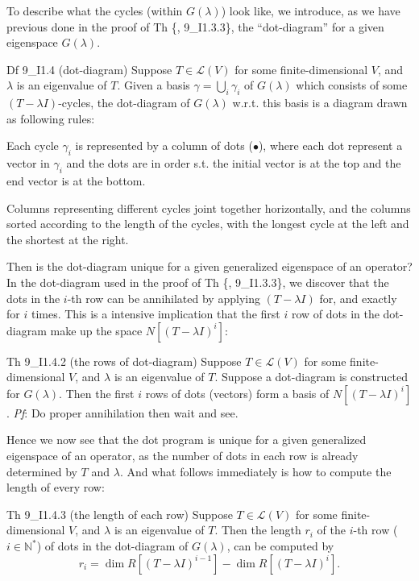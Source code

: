 \documentclass{article}
\begin{document}
To describe what the cycles (within $G(\lambda)$) look like, we introduce, as we have previous done in the proof of Th \{, 9\_I1.3.3\}, the ``dot-diagram'' for a given eigenspace $G(\lambda)$.

\begin{Df}{Df 9\_I1.4 (dot-diagram)}
    Suppose $T\in\mathcal{L}(V)$ for some finite-dimensional $V$, and $\lambda$ is an eigenvalue of $T$. Given a basis $\gamma = \bigcup_{i} \gamma_i$ of $G(\lambda)$ which consists of some $(T-\lambda I)$-cycles, the dot-diagram of $G(\lambda)$ w.r.t. this basis is a diagram drawn as following rules:
    \begin{compactenum}
        \item Each cycle $\gamma_i$ is represented by a column of dots ($\bullet$), where each dot represent a vector in $\gamma_i$ and the dots are in order s.t. the initial vector is at the top and the end vector is at the bottom.
        \item Columns representing different cycles joint together horizontally, and the columns sorted according to the length of the cycles, with the longest cycle at the left and the shortest at the right. 
    \end{compactenum}
\end{Df}

Then is the dot-diagram unique for a given generalized eigenspace of an operator? In the dot-diagram used in the proof of Th \{, 9\_I1.3.3\}, we discover that the dots in the $i$-th row can be annihilated by applying $(T-\lambda I)$ for, and exactly for $i$ times. This is a intensive implication that the first $i$ row of dots in the dot-diagram make up the space $N[(T-\lambda I)^i]$:

\begin{Th}{Th 9\_I1.4.2 (the rows of dot-diagram)}
    Suppose $T\in\mathcal{L}(V)$ for some finite-dimensional $V$, and $\lambda$ is an eigenvalue of $T$. Suppose a dot-diagram is constructed for $G(\lambda)$. Then the first $i$ rows of dots (vectors) form a basis of $N[(T-\lambda I)^i]$.
    \tcblower
    \textit{Pf}: Do proper annihilation then wait and see.
\end{Th}

Hence we now see that the dot program is unique for a given generalized eigenspace of an operator, as the number of dots in each row is already determined by $T$ and $\lambda$. And what follows immediately is how to compute the length of every row:

\begin{Th}{Th 9\_I1.4.3 (the length of each row)}
    Suppose $T\in\mathcal{L}(V)$ for some finite-dimensional $V$, and $\lambda$ is an eigenvalue of $T$. Then the length $r_i$ of the $i$-th row ($i\in\mathbb{N}^\ast$) of dots in the dot-diagram of $G(\lambda)$, can be computed by
    $$ r_i = \dim R[(T-\lambda I)^{i-1}] - \dim R[(T-\lambda I)^i].$$
\end{Th}
\end{document}
